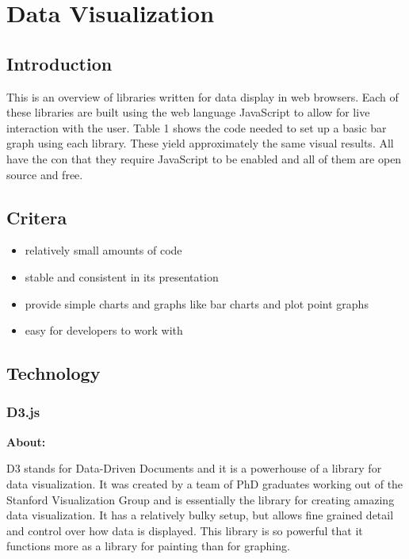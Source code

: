 \documentclass[draftclsnofoot,onecolumn,letterpaper,10pt,compsoc]{IEEEtran}
\begin{document}
\section{Data Visualization}
  \subsection{Introduction}
  This is an overview of libraries written for data display in web browsers.
  Each of these libraries are built using the web language JavaScript to allow for live interaction with the user.
  Table 1 shows the code needed to set up a basic bar graph using each library.
  These yield approximately the same visual results.
  All have the con that they require JavaScript to be enabled and all of them are open source and free.

  \subsection{Critera}
  \begin{itemize}
    \item relatively small amounts of code
    \item stable and consistent in its presentation
    \item provide simple charts and graphs like bar charts and plot point graphs
    \item easy for developers to work with
  \end{itemize}

  \subsection{Technology}

    \subsubsection{D3.js}

    \textbf{About:}

    D3 stands for Data-Driven Documents and it is a powerhouse of a library for data visualization.\cite{d3.org}
    It was created by a team of PhD graduates working out of the Stanford Visualization Group and is essentially the library for creating amazing data visualization.\cite{d3Journal}
    It has a relatively bulky setup, but allows fine grained detail and control over how data is displayed.
    This library is so powerful that it functions more as a library for painting than for graphing.
\end{document}
